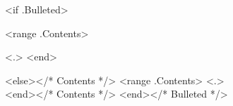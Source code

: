 <if .Bulleted>
\begin{tightitemize}
<range .Contents>
\item <.>
<end> 
\end{tightitemize}
<else></* Contents */>
<range .Contents>
<.>\\
<end></* Contents */>
<end></* Bulleted */>